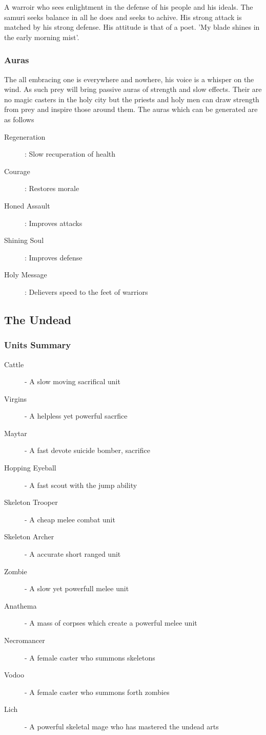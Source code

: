 \documentclass[a4paper]{article}
\begin{document}
A warroir who sees enlightment in the defense of his people and his ideals. The samuri seeks balance in all he does and seeks to achive. His strong attack is matched by his strong defense. His attitude is that of a poet. 'My blade shines in the early morning mist'.

\subsubsection{Auras}

The all embracing one is everywhere and nowhere, his voice is a whisper on the wind. As such prey will bring passive auras of strength and slow effects. Their are no magic casters in the holy city but the priests and holy men can draw strength from prey and inspire those around them.
The auras which can be generated are as follows
\begin{description}
\item [Regeneration]: Slow recuperation of health
\item [Courage]: Restores morale
\item [Honed Assault]: Improves attacks
\item [Shining Soul]: Improves defense
\item [Holy Message]: Delievers speed to the feet of warriors
\end{description}

\subsection{The Undead}

\subsubsection{Units Summary}
\begin{description}
\item [Cattle] - A slow moving sacrifical unit
\item [Virgins] - A helpless yet powerful sacrfice
\item [Maytar] - A fast devote suicide bomber, sacrifice

\item [Hopping Eyeball] - A fast scout with the jump ability

\item [Skeleton Trooper] - A cheap melee combat unit
\item [Skeleton Archer] - A accurate short ranged unit

\item [Zombie] - A slow yet powerfull melee unit
\item [Anathema] - A mass of corpses which create a powerful melee unit

\item [Necromancer] - A female caster who summons skeletons
\item [Vodoo] - A female caster who summons forth zombies
\item [Lich] - A powerful skeletal mage who has mastered the undead arts
\end{description}
\end{document}
